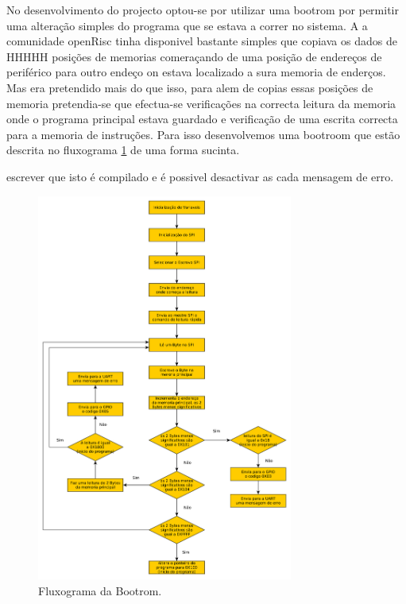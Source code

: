No desenvolvimento do projecto optou-se por utilizar uma bootrom por permitir uma alteração simples do programa que se estava a correr no sistema. A a comunidade openRisc tinha disponivel bastante simples que copiava os dados de HHHHH posições de memorias comeraçando de uma posição de endereços de periférico para outro endeço on estava localizado a sura memoria de enderços.
Mas era pretendido mais do que isso, para alem de copias essas posições de memoria pretendia-se que efectua-se verificações na correcta leitura da memoria onde o programa principal estava guardado e verificação de uma escrita correcta para a memoria de instruções. Para isso desenvolvemos uma bootroom que estão descrita no fluxograma \ref{fig:Fluxo_Bootrom} de uma forma sucinta.

escrever que isto é compilado e é possivel desactivar as cada mensagem de erro.

\begin{figure}[!htb]
  \centering
  \includegraphics[width=0.75\textwidth]{grafos/Bootrom.pdf} %
  \caption[Fluxograma da Bootrom]{Fluxograma da Bootrom.}
  \label{fig:Fluxo_Bootrom}
\end{figure}

